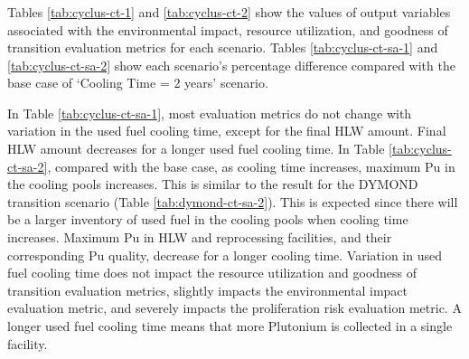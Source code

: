 \begin{table}[]
        \end{table}

    
\subsubsection{\textbf{\Cyclus}}

Tables \ref{tab:cyclus-ct-1} and \ref{tab:cyclus-ct-2} show 
the values of 
output variables associated with the environmental impact, 
resource utilization, and goodness of transition evaluation 
metrics for each scenario. 
Tables \ref{tab:cyclus-ct-sa-1} and \ref{tab:cyclus-ct-sa-2} 
show each scenario's percentage 
difference compared with the base case of `Cooling Time = 2 years'
scenario.

In Table \ref{tab:cyclus-ct-sa-1}, most evaluation metrics do not change 
with variation in the used fuel cooling time, except for the final 
HLW amount. 
Final HLW amount decreases for a longer used fuel cooling time.
In Table \ref{tab:cyclus-ct-sa-2}, compared with the base case, 
as cooling time increases, maximum Pu in the cooling pools increases.
This is similar to the result for the DYMOND transition scenario (Table 
\ref{tab:dymond-ct-sa-2}). 
This is expected since there will be a larger inventory of used fuel 
in the cooling pools when cooling time increases. 
Maximum Pu in HLW and reprocessing facilities, and their corresponding 
Pu quality, decrease for a longer cooling time. 
Variation in used fuel cooling time does not impact the resource utilization 
and goodness of transition evaluation metrics, slightly impacts the environmental 
impact evaluation metric, and severely impacts the proliferation risk evaluation 
metric. 
A longer used fuel cooling time means that more Plutonium is collected in a single 
facility. 


